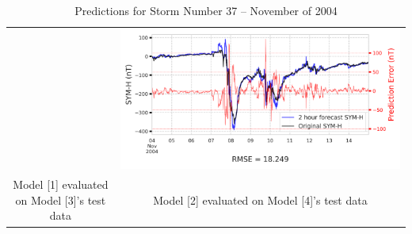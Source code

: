 \documentclass[draft,sw]{agutexSI2019}
\begin{document}
\begin{table}
\begin{tabular}{cc}
&
\includegraphics[width=0.49\linewidth]{paper_plots/2h_swics_model_on_no_swics/2h_swics_model_on_no_swics_storm_37.png}
\\
Model [1] evaluated on Model [3]'s test data & Model [2] evaluated on Model [4]'s test data
\vspace*{12pt}
\\
\end{tabular}
\caption{Predictions for Storm Number 37 -- November of 2004}
\label{storm-37}
\end{table}
\end{document}
